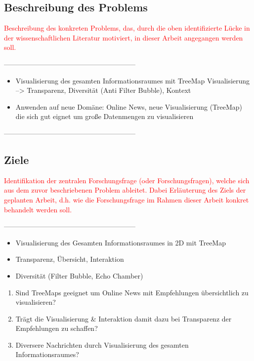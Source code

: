 \documentclass[ngerman, a4paper, abstract=false, twoside=false, parskip=half, DIV=12, bibtotoc]{scrartcl}
\begin{document}
\subsection{Beschreibung des Problems}
\textcolor{red}{Beschreibung des konkreten Problems, das, durch die oben identifizierte Lücke in der wissenschaftlichen Literatur motiviert, in dieser Arbeit angegangen werden soll.}

---------------------------------------------------------

\begin{itemize}
\item Visualisierung des gesamten Informationsraumes mit TreeMap Visualisierung --> Transparenz, Diversität (Anti Filter Bubble), Kontext
\end{itemize}
\begin{itemize}
\item Anwenden auf neue Domäne: Online News, neue Visualisierung (TreeMap) die sich gut eignet um große Datenmengen zu visualisieren
\end{itemize}


---------------------------------------------------------

\subsection{Ziele}
\textcolor{red}{Identifikation der zentralen Forschungsfrage (oder Forschungsfragen), welche sich aus dem zuvor beschriebenen Problem ableitet. Dabei Erläuterung des Ziels der geplanten Arbeit, d.h. wie die Forschungsfrage im Rahmen dieser Arbeit konkret behandelt werden soll.}

---------------------------------------------------------
\begin{itemize}
\item Visualisierung des Gesamten Informationsraumes in 2D mit TreeMap
\item Transparenz, Übersicht, Interaktion
\item Diversität (Filter Bubble, Echo Chamber)
\end{itemize}

\begin{enumerate}
\item Sind TreeMaps geeignet um Online News mit Empfehlungen übersichtlich zu visualisieren?
\item Trägt die Visualisierung & Interaktion damit dazu bei Transparenz der Empfehlungen zu schaffen?
\item Diversere Nachrichten durch Visualisierung des gesamten Informationsraumes? 
\end{enumerate}
\end{document}

